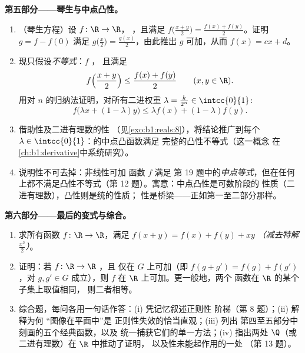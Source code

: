 \begin{problem}[{周末问题——$f(x + y) = f(x) + f(y)$：
正则性导出线性，以及“怪物”的画像}]
\medskip
\noindent\textbf{第五部分——琴生与中点凸性。}
\begin{enumerate}[resume]
  \item （琴生方程）设 $f \colon \R \to \R$，
        ，且满足 $f\bigl(\frac{x+y}{2}\bigr) = \frac{f(x)
        + f(y)}{2}$。证明 $g = f - f(0)$ 满足
        $g\bigl(\frac x2\bigr) = \frac{g(x)}{2}$，由此推出
        $g$ 可加，从而 $f(x) = cx + d$。
  \item 现只假设\emph{不等式}：$f$ ，
        且满足
        \[
        f\Bigl(\frac{x + y}{2}\Bigr) \leq \frac{f(x) +
        f(y)}{2} \qquad (x, y \in \R).
        \]
        用对 $n$ 的归纳法证明，对所有二进权重
        $\lambda = \frac{k}{2^n} \in \intcc{0}{1}$:
        \[
        f\bigl(\lambda x + (1 - \lambda)y\bigr) \leq \lambda
        f(x) + (1 - \lambda) f(y) .
        \]
  \item 借助性及二进有理数的性
        （见\cref{exo:b1:reals:8}），将结论推广到每个 $\lambda \in
        \intcc{0}{1}$：的中点凸函数满足
        完整的凸性不等式（这一概念
        在\cref{ch:b1:derivative}中系统研究）。
  \item 说明性不可去掉：非线性可加
        函数 $f$ 满足
        第 19 题中的\emph{中点等式}，但在任何上都不满足凸性不等式（第
        12 题）。寓意：中点凸性是可数阶段的
        性质（二进有理数），凸性则是统的性质；
        性是桥梁——正如第一至二部分那样。
\end{enumerate}

\medskip
\noindent\textbf{第六部分——最后的变式与综合。}
\begin{enumerate}[resume]
  \item 求所有函数 $f \colon \R \to \R$，满足 $f(x + y)
        = f(x) + f(y) + xy$ \emph{（减去特解
        $\frac{x^2}{2}$）}。
  \item 证明：若 $f \colon \R \to \R$ ，且
        仅在\emph{} $G$ 上可加（即
        $f(g + g') = f(g) + f(g')$，对 $g, g' \in G$ 成立），则 $f$
        在 $\R$ 上可加。更一般地，两个
        函数在 $\R$ 的某个子集上取值相同，
        则二者相等。
  \item 综合题，每问各用一句话作答：(i) 凭记忆叙述正则性
        阶梯（第 8 题）；(ii) 解释为何
        “图像在平面中”是
        正则性失效的恰当直观；(iii) 列出
        第四至五部分中刻画的五个经典函数，以及
        统一捕获它们的单一方法；(iv) 指出两处
        $\Q$（或二进有理数）在 $\R$ 中推动了证明，
        以及性未能起作用的一处
        （第 13 题）。
\end{enumerate}
\end{problem}
